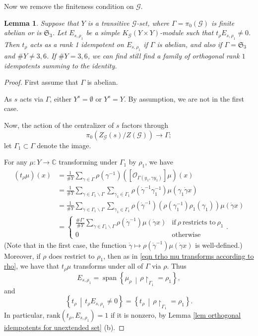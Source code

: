 \documentclass[10pt]{article}
\DeclareMathOperator{\spn}{span}
\newcommand{\Restriction}{\upharpoonright}
\newcommand{\sets}[2]{\left\{#1\,\middle|\,#2\right\}}
\newcommand{\rquotient}{\backslash}
\newcommand{\C}{\mathbb{C}}
\newcommand{\Oo}{\mathcal{O}}
\newcommand{\Sn}{\mathfrak{S}}
\newtheorem{lem}{Lemma}
\theoremstyle{definition}
\theoremstyle{remark}
\newcommand{\Zz}{\mathcal{G}}
\begin{document}
Now we remove the finiteness condition on $\Zz$.
%
\begin{lem}
\label{lem trho act with rank 1 or 0}
Suppose that $Y$ is a transitive $\Zz$-set, where $\Gamma=\pi_0(\Zz)$ is finite abelian or is $\Sn_3$. Let 
$E_{s,\rho_1}$ be a simple $K_\Zz(Y\times Y)$-module such that $t_{\rho}E_{s,\rho_1}\neq 0$. Then $t_\rho$ acts 
as a rank 1 idempotent on $E_{s,\rho_1}$ if $\Gamma$ is abelian, and also if $\Gamma=\Sn_3$ and $\#Y\neq 3, 6$. If $\# Y=3,6$, we can find still find a family of orthogonal rank $1$ idempotents summing to the identity.
\end{lem}
%
\begin{proof}
First assume that $\Gamma$ is abelian.

As $s$ acts via $\Gamma$, either $Y^s=\emptyset$ or $Y^s=Y$. By assumption, 
we are not in the first case.

Now, the action of the centralizer of $s$ factors through 
%
\[
\pi_0(Z_{\Zz}(s)/Z(\Zz))\to\Gamma;
\]
%
let $\Gamma_1\subset\Gamma$ denote the image.

For any $\mu\colon Y\to\C$ transforming under $\Gamma_1$ by $\rho_1$, we have
% 
\begin{align*}
(t_{\rho}\mu)(x)
&=
\frac{1}{\# Y}
\sum_{\gamma\in\Gamma}\rho(\gamma^{-1})\left([\Oo_{\Gamma(y_1,\gamma y_1)}]\mu\right)(x)
\\
&=
\frac{1}{\# Y}
\sum_{\dot{\gamma}\in\Gamma_1\rquotient\Gamma}\sum_{\gamma_1\in\Gamma_1}
\rho(\dot{\gamma}^{-1}\gamma_1^{-1})\mu(\gamma_1\dot{\gamma} x)
\\
&=
\frac{1}{\# Y}
\sum_{\dot{\gamma}\in\Gamma_1\rquotient\Gamma}\sum_{\gamma_1\in\Gamma_1}
\rho(\dot{\gamma}^{-1})\left(\rho(\gamma_1^{-1})\rho_1(\gamma_1)\right)\mu(\dot{\gamma} x)
\\
&=
\begin{cases}
\frac{\#\Gamma'}{\# Y}\sum_{\dot{\gamma}\in\Gamma_1\rquotient\Gamma}\rho(\dot{\gamma}^{-1})\mu(\dot{\gamma}x)& \text{if}~\rho~\text{restricts to}~\rho_1
\\
0&\text{otherwise}
\end{cases}.
\end{align*}
%
(Note that in the first case, the function $\dot{\gamma}\mapsto\rho(\dot{\gamma}^{-1})\mu(\dot{\gamma}x)$ is well-defined.)
Moreover, if $\rho$ does restrict to $\rho_1$, then as in \eqref{eqn trho mu transforms according to rho}, we have that 
$t_\rho\mu$ transforms under all of $\Gamma$ via $\rho$.
%
Thus
%
\[
E_{s,\rho_1}=\spn{\sets{\mu_{\rho}}{\rho\Restriction_{\Gamma_1}=\rho_1}},
\]
%
and
%
\[
\sets{t_\rho}{t_\rho E_{s,\rho_1}\neq 0}=\sets{t_\rho}{\rho\Restriction_{\Gamma_1}=\rho_1}.
\]
%
In particular, $\mathrm{rank}(t_\rho, E_{s,\rho_1})=1$ if it is nonzero, by 
Lemma \ref{lem orthogonal idempotents for unextended set} (b).



\end{proof}
\end{document}
